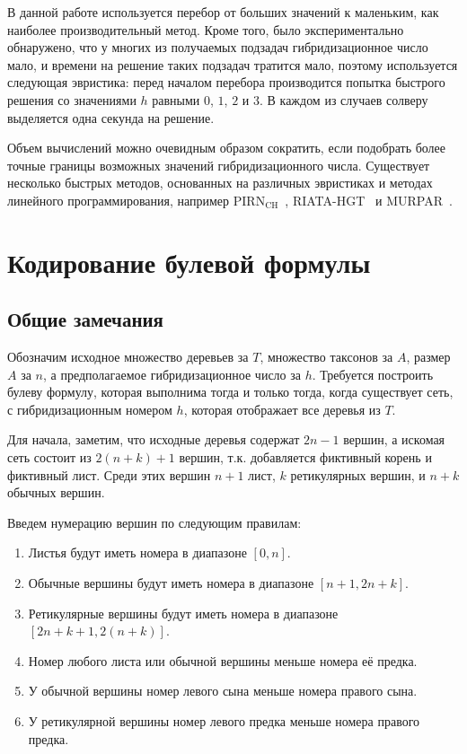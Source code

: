 В данной работе используется перебор от больших значений к маленьким, как наиболее производительный метод.
Кроме того, было экспериментально обнаружено, что у многих из получаемых подзадач гибридизационное число мало, и времени на решение таких подзадач тратится мало, поэтому используется следующая эвристика: перед началом перебора производится попытка быстрого решения со значениями $h$ равными $0$, $1$, $2$ и $3$. В каждом из случаев солверу выделяется одна секунда на решение.


Объем вычислений можно очевидным образом сократить, если подобрать более точные границы возможных значений гибридизационного числа.
Существует несколько быстрых методов, основанных на различных эвристиках и методах линейного программирования, например PIRN$\mathrm{_{CH}}$~\cite{wu2010close}, RIATA-HGT~\cite{nakhleh2005riata} и MURPAR~\cite{park2012murpar}.

\FloatBarrier
\section{Кодирование булевой формулы}

\FloatBarrier
\subsection{Общие замечания}

Обозначим исходное множество деревьев за $T$, множество таксонов за $A$, размер $A$ за $n$, а предполагаемое гибридизационное число за $h$. Требуется построить булеву формулу, которая выполнима тогда и только тогда, когда существует сеть, с гибридизационным номером $h$, которая отображает все деревья из $T$.

Для начала, заметим, что исходные деревья содержат $2 n - 1$ вершин, а искомая сеть состоит из $2 (n + k) + 1$ вершин, т.к. добавляется фиктивный корень и фиктивный лист. Среди этих вершин $n + 1$ лист, $k$ ретикулярных вершин, и $n + k$ обычных вершин.

Введем нумерацию вершин по следующим правилам:

\begin{enumerate}
	\item Листья будут иметь номера в диапазоне $[0, n]$.
	\item Обычные вершины будут иметь номера в диапазоне $[n + 1, 2n + k]$.
	\item Ретикулярные вершины будут иметь номера в диапазоне $[2n + k + 1, 2(n + k)]$.
	\item Номер любого листа или обычной вершины меньше номера её предка.
	\item У обычной вершины номер левого сына меньше номера правого сына.
	\item У ретикулярной вершины номер левого предка меньше номера правого предка.
\end{enumerate}

